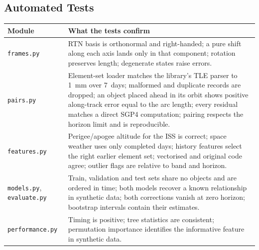 \documentclass[11pt, a4paper]{article}
\begin{document}
\begin{appendices}
\section{Automated Tests}\label{app:tests}

\begin{table}[htbp]
\centering
\small
\begin{tabular}{L{3.2cm}L{11.5cm}}
\toprule
Module & What the tests confirm \\
\midrule
\texttt{frames.py} & RTN basis is orthonormal and right-handed; a pure shift along each axis lands only in that component; rotation preserves length; degenerate states raise errors. \\
\texttt{pairs.py} & Element-set loader matches the library's TLE parser to 1~mm over 7~days; malformed and duplicate records are dropped; an object placed ahead in its orbit shows positive along-track error equal to the arc length; every residual matches a direct SGP4 computation; pairing respects the horizon limit and is reproducible. \\
\texttt{features.py} & Perigee/apogee altitude for the ISS is correct; space weather uses only completed days; history features select the right earlier element set; vectorised and original code agree; outlier flags are relative to band and horizon. \\
\texttt{models.py}, \texttt{evaluate.py} & Train, validation and test sets share no objects and are ordered in time; both models recover a known relationship in synthetic data; both corrections vanish at zero horizon; bootstrap intervals contain their estimates. \\
\texttt{performance.py} & Timing is positive; tree statistics are consistent; permutation importance identifies the informative feature in synthetic data. \\
\bottomrule
\end{tabular}
\end{table}

\end{appendices}
\end{document}
